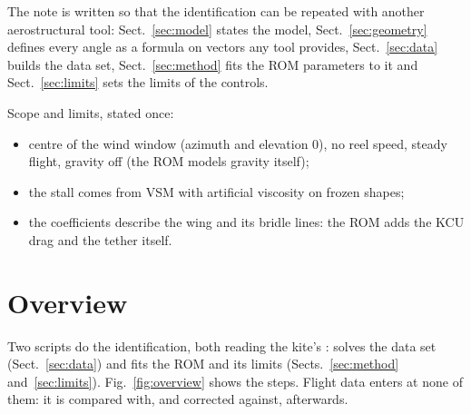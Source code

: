 \documentclass[11pt,a4paper]{article}
\begin{document}
The note is written so that the identification can be repeated with another
aerostructural tool: Sect.~\ref{sec:model} states the model,
Sect.~\ref{sec:geometry} defines every angle as a formula on vectors any tool
provides, Sect.~\ref{sec:data} builds the data set, Sect.~\ref{sec:method} fits the
ROM parameters to it and Sect.~\ref{sec:limits} sets the limits of the controls.

Scope and limits, stated once:
\begin{itemize}
  \item centre of the wind window (azimuth and elevation $0$), no reel speed,
        steady flight, gravity off (the ROM models gravity itself);
  \item the stall comes from VSM with artificial viscosity on frozen shapes;
  \item the coefficients describe the wing and its bridle lines: the ROM adds the
        KCU drag and the tether itself.
\end{itemize}

\section{Overview}
\label{sec:procedure}

Two scripts do the identification, both reading the kite's
:
 solves the data
set (Sect.~\ref{sec:data}) and
 fits the ROM
and its limits (Sects.~\ref{sec:method} and~\ref{sec:limits}).
Fig.~\ref{fig:overview} shows the steps. Flight data enters at none of them: it is
compared with, and corrected against, afterwards.
\end{document}
